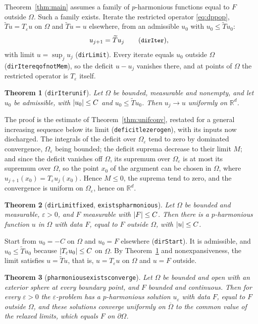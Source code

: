 \documentclass[11pt,reqno]{amsart}
\newcommand{\LEANREF}[1]{\texttt{\small\def\_{\textunderscore\allowbreak}#1}}
\newcommand{\R}{\mathbb{R}}
\newcommand{\eps}{\varepsilon}
\newcommand{\Op}{T_\eps}
\DeclarePairedDelimiter{\abs}{\lvert}{\rvert}
\theoremstyle{plain}
\newtheorem{theorem}{Theorem}[section]
\theoremstyle{definition}
\begin{document}
Theorem~\ref{thm:main} assumes a family of $p$-harmonious functions equal to
$F$ outside $\Omega$. Such a family exists. Iterate the restricted operator
\eqref{eq:dppop}, $\widetilde T u = \Op u$ on $\Omega$ and $\widetilde T u = u$
elsewhere, from an admissible $u_0$ with $u_0 \le \widetilde T u_0$:
\[
  u_{j+1} = \widetilde T u_j \qquad (\LEANREF{dirIter}),
\]
with limit $u = \sup_j u_j$ (\LEANREF{dirLimit}). Every iterate equals $u_0$
outside $\Omega$ (\LEANREF{dirIter\_eq\_of\_notMem}), so the deficit $u - u_j$
vanishes there, and at points of $\Omega$ the restricted operator is $\Op$
itself.

\begin{theorem}[\LEANREF{dirIter\_unif}]\label{thm:dirunif}
Let $\Omega$ be bounded, measurable and nonempty, and let $u_0$ be admissible,
with $\abs{u_0} \le C$ and $u_0 \le \widetilde T u_0$. Then $u_j \to u$
uniformly on $\R^d$.
\end{theorem}

The proof is the estimate of Theorem~\ref{thm:unifconv}, restated for a general
increasing sequence below its limit (\LEANREF{deficit\_le\_zero\_gen}), with
its inputs now discharged. The integrals of the deficit over $\Omega_\eps$ tend
to zero by dominated convergence, $\Omega_\eps$ being bounded; the deficit
suprema decrease to their limit $M$; and since the deficit vanishes off
$\Omega$, its supremum over $\Omega_\eps$ is at most its supremum over
$\Omega$, so the point $x_0$ of the argument can be chosen in $\Omega$, where
$u_{j+1}(x_0) = \Op u_j(x_0)$. Hence $M \le 0$, the suprema tend to zero, and
the convergence is uniform on $\Omega_\eps$, hence on $\R^d$.

\begin{theorem}[\LEANREF{dirLimit\_fixed}, \LEANREF{exists\_pharmonious}]
\label{thm:existsph}
Let $\Omega$ be bounded and measurable, $\eps > 0$, and $F$ measurable with
$\abs F \le C$. Then there is a $p$-harmonious function $u$ in $\Omega$ with
data $F$, equal to $F$ outside $\Omega$, with $\abs u \le C$.
\end{theorem}

Start from $u_0 = -C$ on $\Omega$ and $u_0 = F$ elsewhere (\LEANREF{dirStart}).
It is admissible, and $u_0 \le \widetilde T u_0$ because
$\abs{\Op u_0} \le C$ on $\Omega$. By Theorem~\ref{thm:dirunif} and
nonexpansiveness, the limit satisfies $u = \widetilde T u$, that is,
$u = \Op u$ on $\Omega$ and $u = F$ outside.

\begin{theorem}[\LEANREF{pharmonious\_exists\_converge}]\label{thm:existsconv}
Let $\Omega$ be bounded and open with an exterior sphere at every boundary
point, and $F$ bounded and continuous. Then for every $\eps > 0$ the
$\eps$-problem has a $p$-harmonious solution $u_\eps$ with data $F$, equal to
$F$ outside $\Omega$, and these solutions converge uniformly on
$\overline\Omega$ to the common value of the relaxed limits, which equals $F$
on $\partial\Omega$.
\end{theorem}
\end{document}
